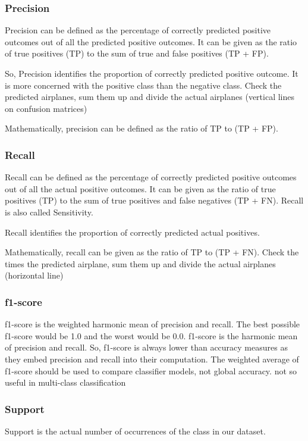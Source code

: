 \documentclass{article}
\begin{document}
\subsubsection{Precision}
Precision can be defined as the percentage of correctly predicted positive outcomes out of all the predicted positive outcomes. It can be given as the ratio of true positives (TP) to the sum of true and false positives (TP + FP).

So, Precision identifies the proportion of correctly predicted positive outcome. It is more concerned with the positive class than the negative class.
Check the predicted airplanes, sum them up and divide the actual airplanes (vertical lines on confusion matrices)

Mathematically, precision can be defined as the ratio of TP to (TP + FP).

\subsubsection{Recall}
Recall can be defined as the percentage of correctly predicted positive outcomes out of all the actual positive outcomes. It can be given as the ratio of true positives (TP) to the sum of true positives and false negatives (TP + FN). Recall is also called Sensitivity.

Recall identifies the proportion of correctly predicted actual positives.

Mathematically, recall can be given as the ratio of TP to (TP + FN).
Check the times the predicted airplane, sum them up and divide the actual airplanes (horizontal line)

\subsubsection{f1-score}
f1-score is the weighted harmonic mean of precision and recall. The best possible f1-score would be 1.0 and the worst would be 0.0. f1-score is the harmonic mean of precision and recall. So, f1-score is always lower than accuracy measures as they embed precision and recall into their computation. The weighted average of f1-score should be used to compare classifier models, not global accuracy.
not so useful in multi-class classification

\subsubsection{Support}
Support is the actual number of occurrences of the class in our dataset.
\end{document}
